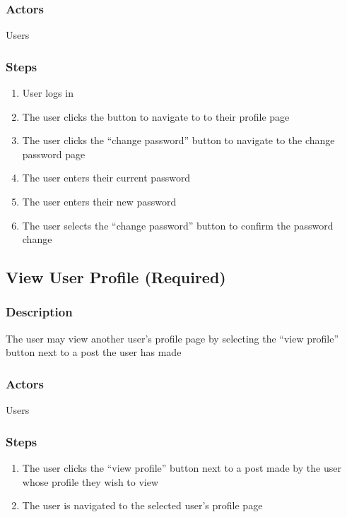 \documentclass[12pt]{scrartcl}
\begin{document}
\subsubsection{Actors}

Users

\subsubsection{Steps}

\begin{enumerate}
\item User logs in
\item The user clicks the button to navigate to to their profile page
\item The user clicks the “change password” button to navigate to the change password page
\item The user enters their current password
\item The user enters their new password
\item The user selects the “change password” button to confirm the password change
\end{enumerate}

\subsection{View User Profile (Required)}
\subsubsection{Description}

The user may view another user’s profile page by selecting the “view profile” button next to a post the user has made

\subsubsection{Actors}

Users

\subsubsection{Steps}

\begin{enumerate}
\item The user clicks the “view profile” button next to a post made by the user whose profile they wish to view
\item The user is navigated to the selected user’s profile page
\end{enumerate}
\end{document}
